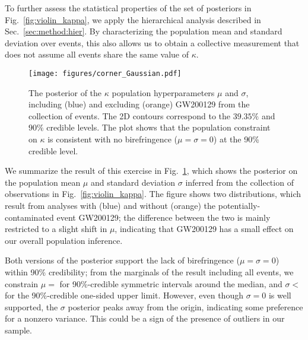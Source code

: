\documentclass[aps,prd,twocolumn,superscriptaddress,preprintnumbers,floatfix,nofootinbib]{revtex4-2}
\begin{document}
To further assess the statistical properties of the set of posteriors in Fig.~\ref{fig:violin_kappa}, we apply the hierarchical analysis described in Sec.~\ref{sec:method:hier}.
By characterizing the population mean and standard deviation over events, this also allows us to obtain a collective measurement that does not assume all events share the same value of $\kappa$.

\begin{figure}
    \texttt{[image: figures/corner\_Gaussian.pdf]}
    \caption{
        The posterior of the $\kappa$ population hyperparameters $\mu$ and $\sigma$, including (blue) and excluding (orange) GW200129 from the collection of events.
        The 2D contours correspond to the $39.35\%$ and $90\%$ credible levels.
        The plot shows that the population constraint on $\kappa$ is consistent with no birefringence ($\mu=\sigma=0$) at the 90\% credible level.
    }
    \label{fig:corner_Gaussian}
\end{figure}

We summarize the result of this exercise in Fig.~\ref{fig:corner_Gaussian}, which shows the posterior on the population mean $\mu$ and standard deviation $\sigma$ inferred from the collection of observations in Fig.~\ref{fig:violin_kappa}.
The figure shows two distributions, which result from analyses with (blue) and without (orange) the potentially-contaminated event GW200129; the difference between the two is mainly restricted to a slight shift in $\mu$, indicating that GW200129 has a small effect on our overall population inference.

Both versions of the posterior support the lack of birefringence ($\mu = \sigma = 0$) within 90\% credibility; from the marginals of the result including all events, we constrain $\mu =$  for 90\%-credible symmetric intervals around the median, and $\sigma <$  for the 90\%-credible one-sided upper limit.
However, even though $\sigma = 0$ is well supported, the $\sigma$ posterior peaks away from the origin, indicating some preference for a nonzero variance.
This could be a sign of the presence of outliers in our sample.
\end{document}
